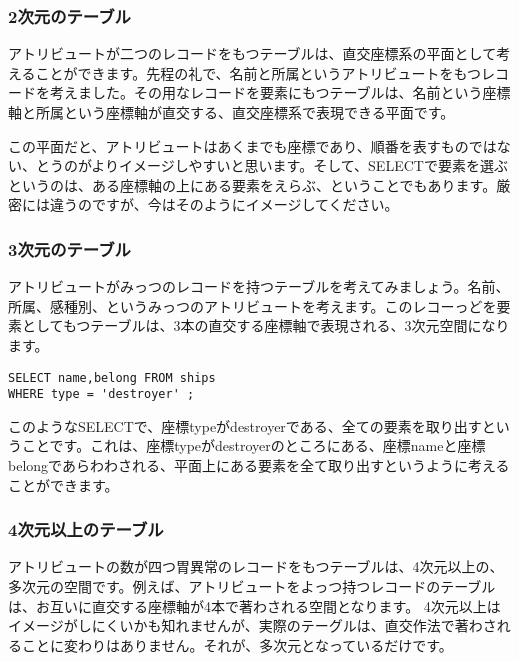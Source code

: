 \subsubsection{2次元のテーブル}

アトリビュートが二つのレコードをもつテーブルは、直交座標系の平面として考えることができます。先程の礼で、名前と所属というアトリビュートをもつレコードを考えました。その用なレコードを要素にもつテーブルは、名前という座標軸と所属という座標軸が直交する、直交座標系で表現できる平面です。

この平面だと、アトリビュートはあくまでも座標であり、順番を表すものではない、とうのがよりイメージしやすいと思います。そして、SELECTで要素を選ぶというのは、ある座標軸の上にある要素をえらぶ、ということでもあります。厳密には違うのですが、今はそのようにイメージしてください。

\subsubsection{3次元のテーブル}

アトリビュートがみっつのレコードを持つテーブルを考えてみましょう。名前、所属、感種別、というみっつのアトリビュートを考えます。このレコーっどを要素としてもつテーブルは、3本の直交する座標軸で表現される、3次元空間になります。

\begin{verbatim}
SELECT name,belong FROM ships
WHERE type = 'destroyer' ;
\end{verbatim}

このようなSELECTで、座標typeがdestroyerである、全ての要素を取り出すということです。これは、座標typeがdestroyerのところにある、座標nameと座標belongであらわわされる、平面上にある要素を全て取り出すというように考えることができます。

\subsubsection{4次元以上のテーブル}

アトリビュートの数が四つ胃異常のレコードをもつテーブルは、4次元以上の、多次元の空間です。例えば、アトリビュートをよっつ持つレコードのテーブルは、お互いに直交する座標軸が4本で著わされる空間となります。
4次元以上はイメージがしにくいかも知れませんが、実際のテーグルは、直交作法で著わされることに変わりはありません。それが、多次元となっているだけです。

